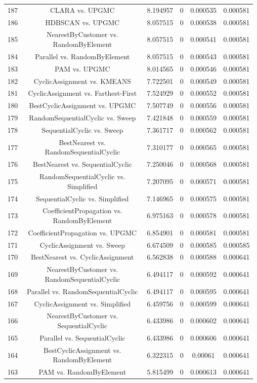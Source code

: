 \documentclass[a4paper,10pt]{article}
\begin{document}
\begin{landscape}
\begin{table}[!htp]
\begin{tabular}{cccccc}
187&CLARA vs. UPGMC&8.194957&0&0.000535&0.000581\\
186&HDBSCAN vs. UPGMC&8.057515&0&0.000538&0.000581\\
185&NearestByCustomer vs. RandomByElement&8.057515&0&0.000541&0.000581\\
184&Parallel vs. RandomByElement&8.057515&0&0.000543&0.000581\\
183&PAM vs. UPGMC&8.014565&0&0.000546&0.000581\\
182&CyclicAssignment vs. KMEANS&7.722501&0&0.000549&0.000581\\
181&CyclicAssignment vs. Farthest-First&7.524929&0&0.000552&0.000581\\
180&BestCyclicAssignment vs. UPGMC&7.507749&0&0.000556&0.000581\\
179&RandomSequentialCyclic vs. Sweep&7.421848&0&0.000559&0.000581\\
178&SequentialCyclic vs. Sweep&7.361717&0&0.000562&0.000581\\
177&BestNearest vs. RandomSequentialCyclic&7.310177&0&0.000565&0.000581\\
176&BestNearest vs. SequentialCyclic&7.250046&0&0.000568&0.000581\\
175&RandomSequentialCyclic vs. Simplified&7.207095&0&0.000571&0.000581\\
174&SequentialCyclic vs. Simplified&7.146965&0&0.000575&0.000581\\
173&CoefficientPropagation vs. RandomByElement&6.975163&0&0.000578&0.000581\\
172&CoefficientPropagation vs. UPGMC&6.854901&0&0.000581&0.000581\\
171&CyclicAssignment vs. Sweep&6.674509&0&0.000585&0.000585\\
170&BestNearest vs. CyclicAssignment&6.562838&0&0.000588&0.000641\\
169&NearestByCustomer vs. RandomSequentialCyclic&6.494117&0&0.000592&0.000641\\
168&Parallel vs. RandomSequentialCyclic&6.494117&0&0.000595&0.000641\\
167&CyclicAssignment vs. Simplified&6.459756&0&0.000599&0.000641\\
166&NearestByCustomer vs. SequentialCyclic&6.433986&0&0.000602&0.000641\\
165&Parallel vs. SequentialCyclic&6.433986&0&0.000606&0.000641\\
164&BestCyclicAssignment vs. RandomByElement&6.322315&0&0.00061&0.000641\\
163&PAM vs. RandomByElement&5.815499&0&0.000613&0.000641\\

\end{tabular}
\end{table}
\end{landscape}
\end{document}
